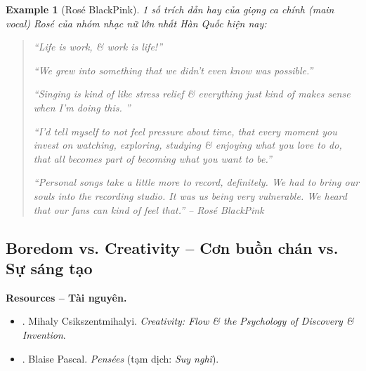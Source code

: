 \documentclass[12pt]{article}
\newtheorem{example}{Example}
\begin{document}
\begin{example}[{\sc Ros\'e BlackPink}]
	1 số trích dẫn hay của giọng ca chính (main vocal) Ros\'e của nhóm nhạc nữ lớn nhất Hàn Quốc hiện nay:
	\begin{quotation}
		``Life is work, \& work is life!''
		
		``We grew into something that we didn't even know was possible.''
		
		``Singing is kind of like stress relief \& everything just kind of makes sense when I'm doing this. ''
		
		``I'd tell myself to not feel pressure about time, that every moment you invest on watching, exploring, studying \& enjoying what you love to do, that all becomes part of becoming what you want to be.''
		
		``Personal songs take a little more to record, definitely. We had to bring our souls into the recording studio. It was us being very vulnerable. We heard that our fans can kind of feel that.'' -- {\sc Ros\'e BlackPink}
	\end{quotation}
\end{example}


\subsection{Boredom vs. Creativity -- Cơn buồn chán  vs. Sự sáng tạo}
\textbf{\textsf{Resources -- Tài nguyên.}}
\begin{itemize}
	\item \cite{Csikszentmihalyi_creativity}. {\sc Mihaly Csikszentmihalyi}. {\it Creativity: Flow \& the Psychology of Discovery \& Invention}.
	\item \cite{Pascal_pensees}. {\sc Blaise Pascal}. {\it Pens\'ees} (tạm dịch: {\it Suy nghĩ}).
\end{itemize}
\end{document}
